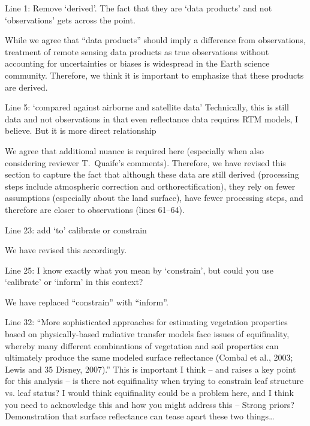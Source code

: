 \begin{reviewer}
  Line 1: Remove ‘derived’. The fact that they are ‘data products’ and not ‘observations’ gets across the point.
\end{reviewer}

While we agree that ``data products'' should imply a difference from observations, treatment of remote sensing data products as true observations without accounting for uncertainties or biases is widespread in the Earth science community.
Therefore, we think it is important to emphasize that these products are derived.

\begin{reviewer}
  Line 5: ‘compared against airborne and satellite data’ Technically, this is still data and not observations in that even reflectance data requires RTM models, I believe. But it is more direct relationship
\end{reviewer}

We agree that additional nuance is required here (especially when also considering reviewer T.\ Quaife’s comments).
Therefore, we have revised this section to capture the fact that although these data are still derived (processing steps include atmospheric correction and orthorectification), they rely on fewer assumptions (especially about the land surface), have fewer processing steps, and therefore are closer to observations (lines 61--64).

\begin{reviewer}
  Line 23: add ‘to’ calibrate or constrain
\end{reviewer}

We have revised this accordingly.

\begin{reviewer}
  Line 25: I know exactly what you mean by ‘constrain’, but could you use ‘calibrate’ or ‘inform’ in this context?
\end{reviewer}

We have replaced ``constrain'' with ``inform''.

\begin{reviewer}
  Line 32: “More sophisticated approaches for estimating vegetation properties based on physically-based radiative transfer models face issues of equifinality, whereby many different combinations of vegetation and soil properties can ultimately produce the same modeled surface reflectance (Combal et al., 2003; Lewis and 35 Disney, 2007).”
  This is important I think – and raises a key point for this analysis – is there not equifinality when trying to constrain leaf structure vs. leaf status? I would think equifinality could be a problem here, and I think you need to acknowledge this and how you might address this – Strong priors? Demonstration that surface reflectance can tease apart these two things\ldots
\end{reviewer}

